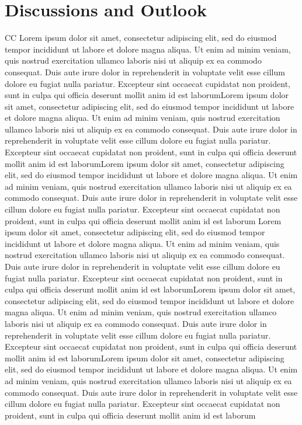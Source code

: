 \documentclass[reprint,superscriptaddress,floatfix]{revtex4-2}
\begin{document}
\section{Discussions and Outlook}
CC
Lorem ipsum dolor sit amet, consectetur adipiscing elit, sed do eiusmod tempor incididunt ut labore et dolore magna aliqua. Ut enim ad minim veniam, quis nostrud exercitation ullamco laboris nisi ut aliquip ex ea commodo consequat. Duis aute irure dolor in reprehenderit in voluptate velit esse cillum dolore eu fugiat nulla pariatur. Excepteur sint occaecat cupidatat non proident, sunt in culpa qui officia deserunt mollit anim id est laborumLorem ipsum dolor sit amet, consectetur adipiscing elit, sed do eiusmod tempor incididunt ut labore et dolore magna aliqua. Ut enim ad minim veniam, quis nostrud exercitation ullamco laboris nisi ut aliquip ex ea commodo consequat. Duis aute irure dolor in reprehenderit in voluptate velit esse cillum dolore eu fugiat nulla pariatur. Excepteur sint occaecat cupidatat non proident, sunt in culpa qui officia deserunt mollit anim id est laborumLorem ipsum dolor sit amet, consectetur adipiscing elit, sed do eiusmod tempor incididunt ut labore et dolore magna aliqua. Ut enim ad minim veniam, quis nostrud exercitation ullamco laboris nisi ut aliquip ex ea commodo consequat. Duis aute irure dolor in reprehenderit in voluptate velit esse cillum dolore eu fugiat nulla pariatur. Excepteur sint occaecat cupidatat non proident, sunt in culpa qui officia deserunt mollit anim id est laborum
Lorem ipsum dolor sit amet, consectetur adipiscing elit, sed do eiusmod tempor incididunt ut labore et dolore magna aliqua. Ut enim ad minim veniam, quis nostrud exercitation ullamco laboris nisi ut aliquip ex ea commodo consequat. Duis aute irure dolor in reprehenderit in voluptate velit esse cillum dolore eu fugiat nulla pariatur. Excepteur sint occaecat cupidatat non proident, sunt in culpa qui officia deserunt mollit anim id est laborumLorem ipsum dolor sit amet, consectetur adipiscing elit, sed do eiusmod tempor incididunt ut labore et dolore magna aliqua. Ut enim ad minim veniam, quis nostrud exercitation ullamco laboris nisi ut aliquip ex ea commodo consequat. Duis aute irure dolor in reprehenderit in voluptate velit esse cillum dolore eu fugiat nulla pariatur. Excepteur sint occaecat cupidatat non proident, sunt in culpa qui officia deserunt mollit anim id est laborumLorem ipsum dolor sit amet, consectetur adipiscing elit, sed do eiusmod tempor incididunt ut labore et dolore magna aliqua. Ut enim ad minim veniam, quis nostrud exercitation ullamco laboris nisi ut aliquip ex ea commodo consequat. Duis aute irure dolor in reprehenderit in voluptate velit esse cillum dolore eu fugiat nulla pariatur. Excepteur sint occaecat cupidatat non proident, sunt in culpa qui officia deserunt mollit anim id est laborum
\end{document}
